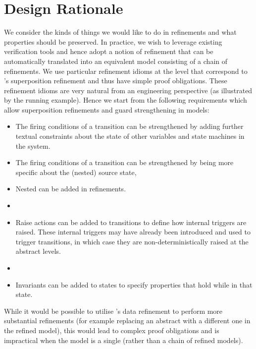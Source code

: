 
\section{Design Rationale}
\label{sec:discussion}
 
We consider the kinds of things we would like to do in \SCXML refinements and what properties should be preserved.
In practice, we wish to leverage existing \EventB verification tools and hence adopt a notion of refinement that can be automatically translated into an equivalent \EventB model consisting of a chain of refinements.
We use particular refinement idioms at the \statechart level that correspond to \EventB's superposition refinement and thus have simple proof obligations. 
These refinement idioms are very natural from an engineering perspective (as illustrated by the running example).
Hence we start from the following requirements which allow superposition refinements and guard strengthening in \SCXML models:
\begin{itemize}
	\item The firing conditions of a transition can be strengthened by adding further textual constraints about the state of other variables and state machines in the system.
	\item The firing conditions of a transition can be strengthened by being more specific about the (nested) source state,
	\item Nested \Statecharts can be added in refinements.
	\item {} 
	\item Raise actions can be added to transitions to define how internal triggers are raised. These internal triggers may have already been introduced and used to trigger transitions, in which case they are non-deterministically raised at the abstract levels. 
	\item {}
	\item Invariants can be added to states to specify properties that hold while in that state.
\end{itemize}
While it would be possible to utilise \EventB's data refinement to perform more substantial \statechart refinements (for example replacing an abstract \statechart with a different one in the refined model), this would lead to complex proof obligations and is impractical when the \SCXML model is a single \Statechart (rather than a chain of refined models).


